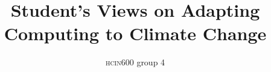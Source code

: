 \documentclass[sigconf]{acmart}
\begin{document}
\title{Student’s Views on Adapting Computing to Climate Change}

\author{\textsc{hcin}600 group 4}






\renewcommand{\shortauthors}{Group 4}

\begin{abstract}

\end{abstract}

\end{document}
